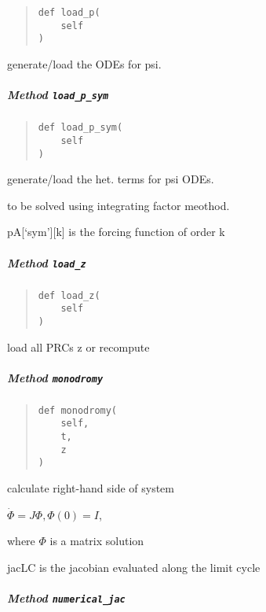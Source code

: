 \documentclass[
  english,
  a4paper,
  oneside]{article}
\begin{document}
\begin{quote}
\begin{verbatim}
def load_p(
    self
)
\end{verbatim}
\end{quote}

generate/load the ODEs for psi.

\hypertarget{StrongCoupling.StrongCoupling.load_p_sym}{%
\subparagraph{\texorpdfstring{Method
\texttt{load\_p\_sym}}{Method load\_p\_sym}}\label{StrongCoupling.StrongCoupling.load_p_sym}}

\begin{quote}
\begin{verbatim}
def load_p_sym(
    self
)
\end{verbatim}
\end{quote}

generate/load the het. terms for psi ODEs.

to be solved using integrating factor meothod.

pA{[}`sym'{]}{[}k{]} is the forcing function of order k

\hypertarget{StrongCoupling.StrongCoupling.load_z}{%
\subparagraph{\texorpdfstring{Method
\texttt{load\_z}}{Method load\_z}}\label{StrongCoupling.StrongCoupling.load_z}}

\begin{quote}
\begin{verbatim}
def load_z(
    self
)
\end{verbatim}
\end{quote}

load all PRCs z or recompute

\hypertarget{StrongCoupling.StrongCoupling.monodromy}{%
\subparagraph{\texorpdfstring{Method
\texttt{monodromy}}{Method monodromy}}\label{StrongCoupling.StrongCoupling.monodromy}}

\begin{quote}
\begin{verbatim}
def monodromy(
    self,
    t,
    z
)
\end{verbatim}
\end{quote}

calculate right-hand side of system

\(\dot \Phi = J\Phi, \Phi(0)=I\),

where \(\Phi\) is a matrix solution

jacLC is the jacobian evaluated along the limit cycle

\hypertarget{StrongCoupling.StrongCoupling.numerical_jac}{%
\subparagraph{\texorpdfstring{Method
\texttt{numerical\_jac}}{Method numerical\_jac}}\label{StrongCoupling.StrongCoupling.numerical_jac}}
\end{document}
